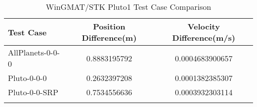 \begin{table}[htbp!]
\centering
\caption{ WinGMAT/STK Pluto1 Test Case Comparison}
      \begin{tabular}{lcc}
      \hline\hline
          Test Case & Position Difference(m) & Velocity Difference(m/s) \\
         \hline
         AllPlanets-0-0-0 & 0.8883195792 & 0.0004683900657 \\
         Pluto-0-0-0 & 0.2632397208 & 0.0001382385307 \\
         Pluto-0-0-SRP & 0.7534556636 & 0.0003932303114 \\
      \hline\hline
      \label{Table: Pluto1 WinGMAT-STK Table} 
\end{tabular}
\end{table}
